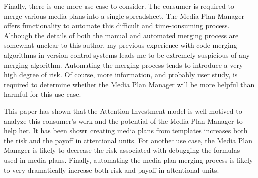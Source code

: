 \documentclass{article}
\begin{document}
	Finally, there is one more use case to consider. The consumer is required to merge various media plans into a single spreadsheet. The Media Plan Manager offers functionality to automate this difficult and time-consuming process. Although the details of both the manual and automated merging process are somewhat unclear to this author, my previous experience with code-merging algorithms in version control systems leads me to be extremely suspicious of any merging algorithm. Automating the merging process tends to introduce a very high degree of risk. Of course, more information, and probably user study, is required to determine whether the Media Plan Manager will be more helpful than harmful for this use case.
	
	This paper has shown that the Attention Investment model is well motived to analyze this consumer's work and the potential of the Media Plan Manager to help her. It has been shown creating media plans from templates increases both the risk and the payoff in attentional units. For another use case, the Media Plan Manager is likely to decrease the risk associated with debugging the formulas used in media plans. Finally, automating the media plan merging process is likely to very dramatically increase both risk and payoff in attentional units.
	
\end{document}
